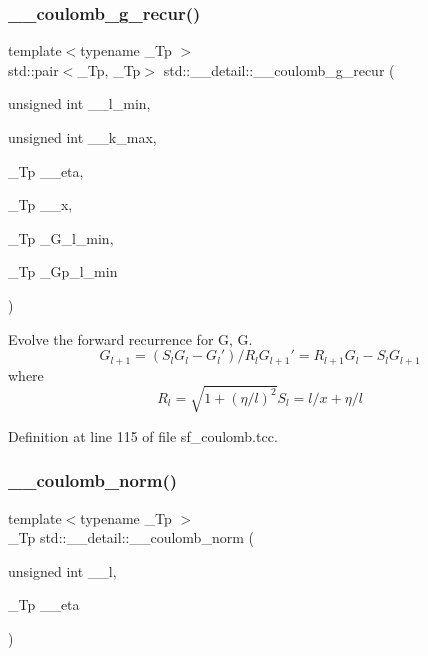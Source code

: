 \subsubsection{\texorpdfstring{\+\_\+\+\_\+coulomb\+\_\+g\+\_\+recur()}{\_\_coulomb\_g\_recur()}}
{\footnotesize\ttfamily template$<$typename \+\_\+\+Tp $>$ \\
std\+::pair$<$\+\_\+\+Tp, \+\_\+\+Tp$>$ std\+::\+\_\+\+\_\+detail\+::\+\_\+\+\_\+coulomb\+\_\+g\+\_\+recur (\begin{DoxyParamCaption}\item[{unsigned int}]{\+\_\+\+\_\+l\+\_\+min,  }\item[{unsigned int}]{\+\_\+\+\_\+k\+\_\+max,  }\item[{\+\_\+\+Tp}]{\+\_\+\+\_\+eta,  }\item[{\+\_\+\+Tp}]{\+\_\+\+\_\+x,  }\item[{\+\_\+\+Tp}]{\+\_\+\+G\+\_\+l\+\_\+min,  }\item[{\+\_\+\+Tp}]{\+\_\+\+Gp\+\_\+l\+\_\+min }\end{DoxyParamCaption})}

Evolve the forward recurrence for G, G\textquotesingle{}. \[ G_{l+1} = (S_l G_l - G_l')/R_l G_{l+1}' = R_{l+1} G_l - S_l G_{l+1} \] where \[ R_l = \sqrt{1 + (\eta / l)^2} S_l = l / x + \eta / l \] 

Definition at line 115 of file sf\+\_\+coulomb.\+tcc.

\mbox{\label{namespacestd_1_1____detail_a568c1e2b831de815e9ffb1b9c9fe1170}} 
\subsubsection{\texorpdfstring{\+\_\+\+\_\+coulomb\+\_\+norm()}{\_\_coulomb\_norm()}}
{\footnotesize\ttfamily template$<$typename \+\_\+\+Tp $>$ \\
\+\_\+\+Tp std\+::\+\_\+\+\_\+detail\+::\+\_\+\+\_\+coulomb\+\_\+norm (\begin{DoxyParamCaption}\item[{unsigned int}]{\+\_\+\+\_\+l,  }\item[{\+\_\+\+Tp}]{\+\_\+\+\_\+eta }\end{DoxyParamCaption})}




